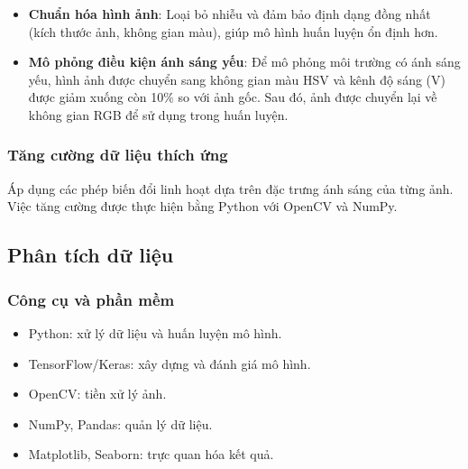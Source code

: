 \begin{itemize}
    \item \textbf{Chuẩn hóa hình ảnh}: Loại bỏ nhiễu và đảm bảo định dạng đồng nhất (kích thước ảnh, không gian màu), giúp mô hình huấn luyện ổn định hơn.
    
    \item \textbf{Mô phỏng điều kiện ánh sáng yếu}: Để mô phỏng môi trường có ánh sáng yếu, hình ảnh được chuyển sang không gian màu HSV và kênh độ sáng (V) được giảm xuống còn 10\% so với ảnh gốc. Sau đó, ảnh được chuyển lại về không gian RGB để sử dụng trong huấn luyện.
\end{itemize}

\subsubsection{Tăng cường dữ liệu thích ứng}
Áp dụng các phép biến đổi linh hoạt dựa trên đặc trưng ánh sáng của từng ảnh. Việc tăng cường được thực hiện bằng Python với OpenCV và NumPy.

\subsection{Phân tích dữ liệu}
\subsubsection{Công cụ và phần mềm}
\begin{itemize}
    \item Python: xử lý dữ liệu và huấn luyện mô hình.
    \item TensorFlow/Keras: xây dựng và đánh giá mô hình.
    \item OpenCV: tiền xử lý ảnh.
    \item NumPy, Pandas: quản lý dữ liệu.
    \item Matplotlib, Seaborn: trực quan hóa kết quả.
\end{itemize}

